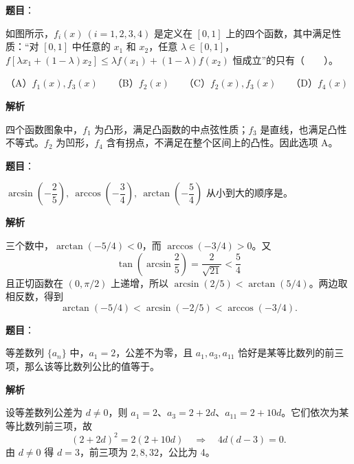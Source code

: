 \begin{answer}

\textbf{题目}：

如图所示，\(f_i(x)\ (i=1,2,3,4)\) 是定义在 \([0,1]\) 上的四个函数，其中满足性质：“对 \([0,1]\) 中任意的 \(x_1\) 和 \(x_2\)，任意 \(\lambda\in[0,1]\)，\(f[\lambda x_1+(1-\lambda)x_2]\leqslant\lambda f(x_1)+(1-\lambda)f(x_2)\) 恒成立”的只有\mbox{（　　）}。
\nopagebreak[4]
\begin{center}\end{center}
\nopagebreak[4]
（A）\(f_1(x),f_3(x)\)　　（B）\(f_2(x)\)　　（C）\(f_2(x),f_3(x)\)　　（D）\(f_4(x)\)

\textbf{解析}

四个函数图象中，\(f_1\) 为凸形，满足凸函数的中点弦性质；\(f_3\) 是直线，也满足凸性不等式。\(f_2\) 为凹形，\(f_4\) 含有拐点，不满足在整个区间上的凸性。因此选项 A。


\end{answer}
\begin{answer}

\textbf{题目}：

\(\arcsin\left(-\dfrac25\right),\ \arccos\left(-\dfrac34\right),\ \arctan\left(-\dfrac54\right)\) 从小到大的顺序是\gkblank{}。

\textbf{解析}

三个数中，\(\arctan(-5/4)<0\)，而 \(\arccos(-3/4)>0\)。又
\nopagebreak[4]
\[
\tan\left(\arcsin\frac25\right)=\frac{2}{\sqrt{21}}<\frac54
\]
且正切函数在 \((0,\pi/2)\) 上递增，所以 \(\arcsin(2/5)<\arctan(5/4)\)。两边取相反数，得到
\nopagebreak[4]
\[
\arctan(-5/4)<\arcsin(-2/5)<\arccos(-3/4).
\]


\end{answer}
\begin{answer}

\textbf{题目}：

等差数列 \(\{a_n\}\) 中，\(a_1=2\)，公差不为零，且 \(a_1,a_3,a_{11}\) 恰好是某等比数列的前三项，那么该等比数列公比的值等于\gkblank{}。

\textbf{解析}

设等差数列公差为 \(d\ne0\)，则 \(a_1=2\)、\(a_3=2+2d\)、\(a_{11}=2+10d\)。它们依次为某等比数列前三项，故
\nopagebreak[4]
\[
(2+2d)^2=2(2+10d)
\quad\Longrightarrow\quad
4d(d-3)=0.
\]
由 \(d\ne0\) 得 \(d=3\)，前三项为 \(2,8,32\)，公比为 4。


\end{answer}
